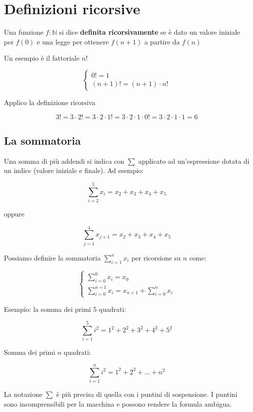\section{Definizioni ricorsive}

Una funzione $f : \mathbb{N}$  si dice { \bf definita ricorsivamente } se è dato un valore iniziale per $f(0)$ e una legge per ottenere $f(n+1)$ a partire da $f(n)$

Un esempio è il fattoriale $n!$

$$\begin{cases}
0! = 1 \\
(n + 1)! = (n + 1) \cdot n!
\end{cases}$$

Applico la definizione ricorsiva

$$3! = 3 \cdot 2! = 3 \cdot 2 \cdot 1! = 3 \cdot 2 \cdot 1 \cdot 0! = 3 \cdot 2 \cdot 1 \cdot 1 = 6 $$



\subsection{La sommatoria}

Una somma di più addendi si indica con $\sum$ applicato ad un'espressione dotata di un indice (valore iniziale e finale). Ad esempio:

$$\displaystyle \sum_{i=2}^{5} {x_i} = x_2 + x_3 + x_4 + x_5$$ 

oppure

$$\displaystyle \sum_{j=1}^{4} {x_{j+1}} = x_2 + x_3 + x_4 + x_5$$

Possiamo definire la sommatoria $\sum_{i=1}^{n}{x_i}$ per ricorsione su $n$ come:

$$\begin{cases}
\displaystyle \sum_{i=0}^0 {x_i} = x_0 \\
\displaystyle \sum_{i=0}^{n+1} {x_i} = x_{n+1} + \sum_{i=0}^{n} {x_i}
\end{cases}$$


Esempio: la somma dei primi 5 quadrati:

$$\displaystyle \sum_{i=1}^{5} {i^2} = 1^2 + 2^2 + 3^2 + 4^2 + 5^2 $$

Somma dei primi $n$ quadrati:

$$\displaystyle \sum_{i=1}^{n} {i^2} = 1^2 + 2^2 + ... + n^2$$

La notazione $\sum$ è più precisa di quella con i puntini di sospensione.
I puntini sono incomprensibili per la macchina e possono rendere la formula ambigua.

